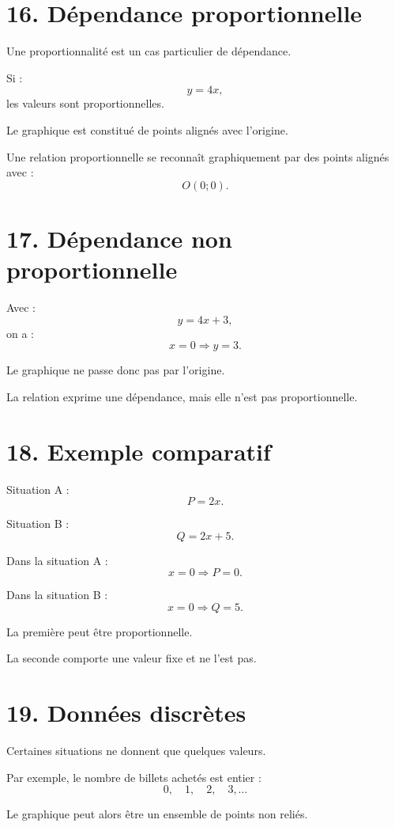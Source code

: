 \section{16. Dépendance proportionnelle}

Une proportionnalité est un cas particulier de dépendance.

Si :
\[
y=4x,
\]
les valeurs sont proportionnelles.

Le graphique est constitué de points alignés avec l'origine.

\begin{propriete}
Une relation proportionnelle se reconnaît graphiquement par des points alignés avec :
\[
O(0;0).
\]
\end{propriete}

\section{17. Dépendance non proportionnelle}

Avec :
\[
y=4x+3,
\]
on a :
\[
x=0\Rightarrow y=3.
\]

Le graphique ne passe donc pas par l'origine.

La relation exprime une dépendance, mais elle n'est pas proportionnelle.

\section{18. Exemple comparatif}

Situation A :
\[
P=2x.
\]

Situation B :
\[
Q=2x+5.
\]

Dans la situation A :
\[
x=0\Rightarrow P=0.
\]

Dans la situation B :
\[
x=0\Rightarrow Q=5.
\]

La première peut être proportionnelle.

La seconde comporte une valeur fixe et ne l'est pas.

\section{19. Données discrètes}

Certaines situations ne donnent que quelques valeurs.

Par exemple, le nombre de billets achetés est entier :
\[
0,\quad1,\quad2,\quad3,\ldots
\]

Le graphique peut alors être un ensemble de points non reliés.

